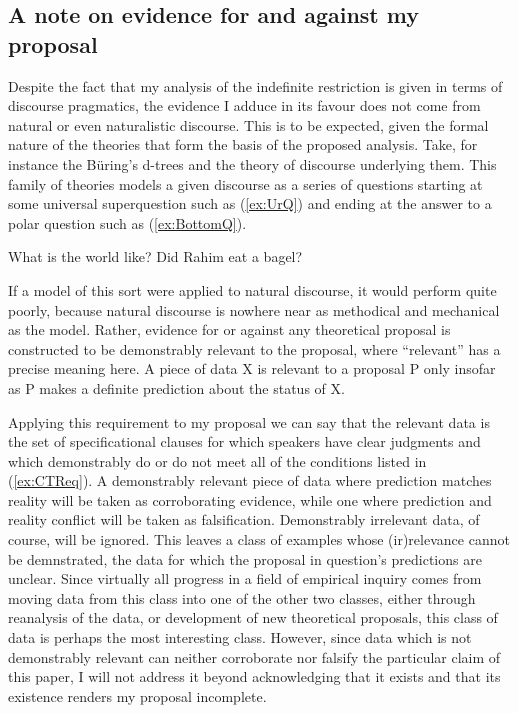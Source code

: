 \documentclass[
	letterpaper,
]{article}
\begin{document}
\subsection{A note on evidence for and against my proposal}
Despite the fact that my analysis of the indefinite restriction is given in terms of discourse pragmatics, the evidence I adduce in its favour does not come from natural or even naturalistic discourse.
This is to be expected, given the formal nature of the theories that form the basis of the proposed analysis.
Take, for instance the B\"uring's d-trees and the theory of discourse underlying them.
This family of theories models a given discourse as a series of questions starting at some universal superquestion such as (\ref{ex:UrQ}) and ending at the answer to a polar question such as (\ref{ex:BottomQ}).
\begin{exe}
	\ex\label{ex:UrQ} What is the world like?
	\ex\label{ex:BottomQ} Did Rahim eat a bagel?
\end{exe}
If a model of this sort were applied to natural discourse, it would perform quite poorly, because natural discourse is nowhere near as methodical and mechanical as the model.
Rather, evidence for or against any theoretical proposal is constructed to be demonstrably relevant to the proposal, where ``relevant'' has a precise meaning here.
A piece of data X is relevant to a proposal P only insofar as P makes a definite prediction about the status of X.

Applying this requirement to my proposal we can say that the relevant data is the set of specificational clauses for which speakers have clear judgments and which demonstrably do or do not meet all of the conditions listed in (\ref{ex:CTReq}).
A demonstrably relevant piece of data where prediction matches reality will be taken as corroborating evidence, while one where prediction and reality conflict will be taken as falsification.
Demonstrably irrelevant data, of course, will be ignored.
This leaves a class of examples whose (ir)relevance cannot be demnstrated, the data for which the proposal in question's predictions are unclear.
Since virtually all progress in a field of empirical inquiry comes from moving data from this class into one of the other two classes, either through reanalysis of the data, or development of new theoretical proposals, this class of data is perhaps the most interesting class.
However, since data which is not demonstrably relevant can neither corroborate nor falsify the particular claim of this paper, I will not address it beyond acknowledging that it exists and that its existence renders my proposal incomplete.
\end{document}
